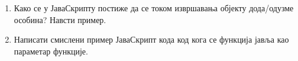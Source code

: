 \documentclass[a4paper]{article}
\begin{document}
\begin{enumerate}
\hrulefill

\item Како се у ЈаваСкрипту постиже да се током извршавања објекту дода/одузме особина? Навсти пример. \hrulefill

\hrulefill

\hrulefill

\hrulefill

\hrulefill

\hrulefill

\hrulefill

\hrulefill

\hrulefill

\hrulefill

\hrulefill


\item Написати смислени пример ЈаваСкрипт кода код кога се функција јавља као параметар функције. 

\hrulefill

\hrulefill

\hrulefill

\hrulefill

\hrulefill

\hrulefill

\hrulefill

\hrulefill

\hrulefill

\hrulefill


\end{enumerate}
\end{document}
